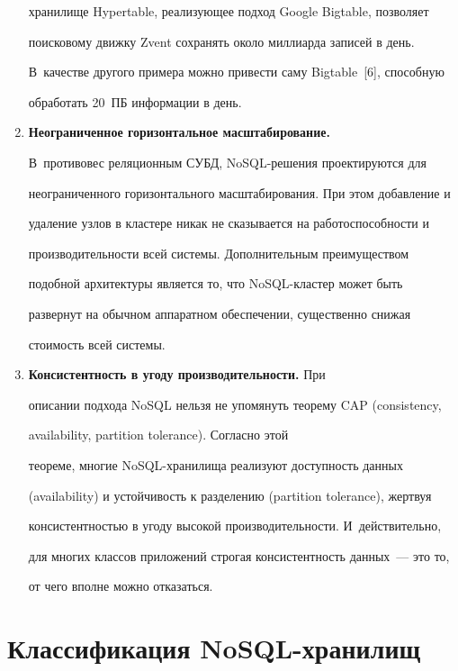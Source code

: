 \begin{multicols}{2}
\begin{enumerate}[1.]
хранилище Hypertable, реализующее подход Google Bigtable, позволяет 


поисковому движку Zvent сохранять около миллиарда записей в день. 


В~качестве другого примера можно привести саму Bigtable~[6], способную 


обработать 20~ПБ информации в день.


\item \textbf{Неограниченное горизонтальное масштабирование.} 


В~противовес реляционным СУБД, NoSQL-ре\-ше\-ния проектируются для 


неограниченного горизонтального масштабирования. При этом добавление и 


удаление узлов в кластере никак не сказывается на работоспособности и 


производительности всей системы. Дополнительным преимуществом 


подобной архитектуры является то, что NoSQL-клас\-тер может быть 


развернут на обычном аппаратном обеспечении, существенно снижая 


стоимость всей системы.


\item \textbf{Консистентность в угоду производительности.} При 


описании подхода NoSQL нельзя не упомянуть теорему CAP (consistency,


availability, partition tolerance). Согласно этой 


теореме, многие NoSQL-хра\-ни\-ли\-ща реализуют доступность данных 


(availability) и устойчивость к разделению (partition tolerance), жертвуя 


консистентностью в угоду высокой производительности. И~действительно, 


для многих классов приложений строгая консистентность данных~--- это то, 


от чего вполне можно отказаться.


\end{enumerate}





\section{Классификация NoSQL-хранилищ}






\end{multicols}
